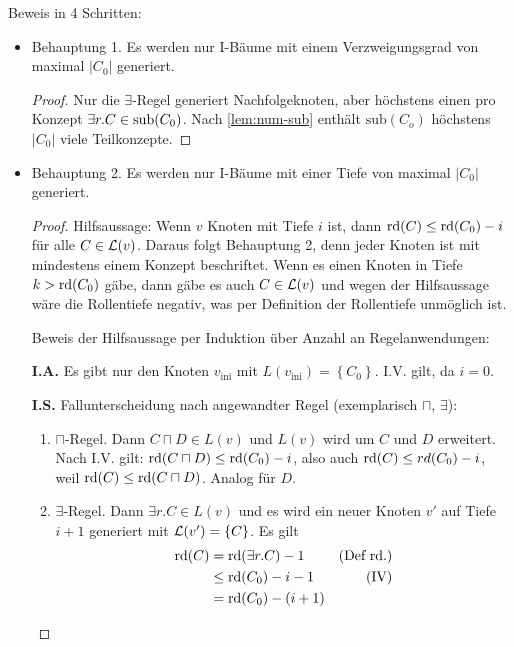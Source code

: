 Beweis in 4 Schritten:
\begin{itemize}
    \item Behauptung 1.
  Es werden nur I-Bäume mit einem Verzweigungsgrad
  von maximal $|C_0|$ generiert.
  \begin{tafel} \begin{proof}
        Nur die $\exists$-Regel generiert Nachfolgeknoten, aber
        höchstens einen pro Konzept $\exists r.C \in \operatorname{sub}(C_0)$. Nach
        \autoref{lem:num-sub}  enthält
        $\text{sub}\left( C_{o} \right)$ höchstens $\left| C_{0} \right|$
        viele Teilkonzepte.
    \end{proof}\end{tafel}
\item Behauptung 2.
  Es werden nur I-Bäume mit einer Tiefe von maximal $\left| C_{0} \right|$
  generiert.
    \begin{tafel} \begin{proof}
        Hilfsaussage: Wenn $v$ Knoten mit Tiefe $i$ ist, dann $\operatorname{rd}(C) \leq \operatorname{rd}(C_0) - i$ für alle $C \in \mathcal{L}(v)$. Daraus folgt Behauptung 2, denn jeder Knoten ist mit mindestens einem Konzept beschriftet. Wenn es einen Knoten in Tiefe $k > \operatorname{rd}(C_0)$ gäbe, dann gäbe es auch $C\in \mathcal{L}(v)$ und wegen der Hilfsaussage wäre die Rollentiefe negativ, was per Definition der Rollentiefe unmöglich ist.

        Beweis der Hilfsaussage per Induktion über Anzahl an Regelanwendungen:

        \textbf{I.A.} Es gibt nur den Knoten $v_{\text{ini}}$ mit
$L\left( v_{\text{ini}} \right) = \left\{ C_{0} \right\}$. I.V. gilt,
da $i = 0$.

\textbf{I.S.} Fallunterscheidung nach angewandter Regel (exemplarisch
$\sqcap$, $\exists$):

\begin{enumerate}
\item $\sqcap$-Regel. Dann $C \sqcap D \in L(v)$ und $L(v)$ wird um $C$ und $D$ erweitert.
Nach I.V. gilt: $\rd\left( C \sqcap D \right) \leq \rd\left( C_{0} \right) - i$,
also auch $\rd\left( C \right) \leq rd\left( C_{0} \right) - i$,
weil $\rd\left( C \right) \leq \rd\left( C \sqcap D \right)$.
Analog für $D$.

\item $\exists$-Regel. Dann $\exists r.C \in L\left( v \right)$ und es wird
    ein neuer Knoten $v'$ auf Tiefe $i + 1$ generiert mit
$\ML\left( v' \right) = \left\{ C \right\}$. Es gilt
\begin{align*}
    \rd\left( C \right) &= \rd\left( \exists r.C \right) - 1 & \text{(Def rd.)}\\
                        &\leq \rd\left( C_{0} \right) - i - 1 & \text{(IV)}\\
                        &= \rd\left( C_{0} \right) - (i + 1)
\end{align*} \end{enumerate} \end{proof}
\end{tafel}


\end{itemize}
